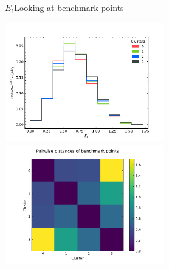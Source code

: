 \begin{frame}{$E_\ell$}{Looking at benchmark points}
	\begin{changemargin}{-1cm}{-1cm}
		\begin{center}
			{\includegraphics[height=5.2cm, clip, trim=0cm 0cm 1.2cm 1cm]{figures/from-paper/El_tanbeta_dist3}}
			{\includegraphics[height=5.2cm, clip, trim=2.3cm 0cm 2cm 0cm]{figures/from-paper/El_tanbeta_dist3_bpoint_distances}}
		\end{center}
	\end{changemargin}
\end{frame}